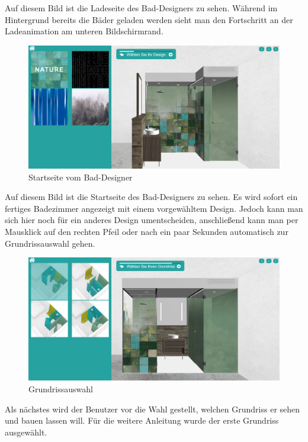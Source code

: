 \noindent Auf diesem Bild ist die Ladeseite des Bad-Designers zu sehen. Während im Hintergrund bereits die Bäder geladen werden sieht man den Fortschritt an der Ladeanimation am unteren Bildschirmrand.



\begin{figure}[h]
    \centering
    \includegraphics[width=1\linewidth]{images/screenshots/01.png}
    \caption{Startseite vom Bad-Designer}
    \label{}
\end{figure}
\noindent Auf diesem Bild ist die Startseite des Bad-Designers zu sehen. Es wird sofort ein fertiges Badezimmer angezeigt mit einem vorgewähltem Design. Jedoch kann man sich hier noch für ein anderes Design umentscheiden, anschließend kann man per Mausklick auf den rechten Pfeil oder nach ein paar Sekunden automatisch zur Grundrissauswahl gehen.
\clearpage \newpage
\begin{figure}[h]
    \centering
    \includegraphics[width=1\linewidth]{images/screenshots/02.png}
    \caption{Grundrissauswahl}
    \label{}
\end{figure}
\noindent Als nächstes wird der Benutzer vor die Wahl gestellt, welchen Grundriss er sehen und bauen lassen will. Für die weitere Anleitung wurde der erste Grundriss ausgewählt.

